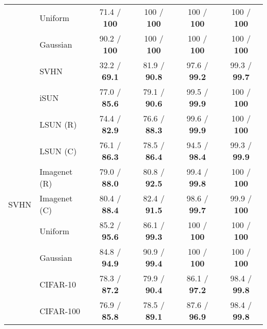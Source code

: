 \documentclass{article}
\begin{document}
\begin{table}[tbh]
\begin{tabular}{clcccc}
     & Uniform &   71.4 / \textbf{100} &    100 / \textbf{100} &    100 / \textbf{100} &    100 / \textbf{100} \\
     & Gaussian &   90.2 / \textbf{100} &    100 / \textbf{100} &    100 / \textbf{100} &    100 / \textbf{100} \\
     & SVHN &  32.2 / \textbf{69.1} &  81.9 / \textbf{90.8} &  97.6 / \textbf{99.2} &  99.3 / \textbf{99.7} \\
\midrule
\multirow{9}{*}{SVHN} & iSUN &  77.0 / \textbf{85.6} &  79.1 / \textbf{90.6} &  99.5 / \textbf{99.9} &    100 / \textbf{100} \\
     & LSUN (R) &  74.4 / \textbf{82.9} &  76.6 / \textbf{88.3} &  99.6 / \textbf{99.9} &    100 / \textbf{100} \\
     & LSUN (C) &  76.1 / \textbf{86.3} &  78.5 / \textbf{86.4} &  94.5 / \textbf{98.4} &  99.3 / \textbf{99.9} \\
     & Imagenet (R) &  79.0 / \textbf{88.0} &  80.8 / \textbf{92.5} &  99.4 / \textbf{99.8} &    100 / \textbf{100} \\
     & Imagenet (C) &  80.4 / \textbf{88.4} &  82.4 / \textbf{91.5} &  98.6 / \textbf{99.7} &   99.9 / \textbf{100} \\
     & Uniform &  85.2 / \textbf{95.6} &  86.1 / \textbf{99.3} &    100 / \textbf{100} &    100 / \textbf{100} \\
     & Gaussian &  84.8 / \textbf{94.9} &  90.9 / \textbf{99.4} &    100 / \textbf{100} &    100 / \textbf{100} \\
     & CIFAR-10 &  78.3 / \textbf{87.2} &  79.9 / \textbf{90.4} &  86.1 / \textbf{97.2} &  98.4 / \textbf{99.8} \\
     & CIFAR-100 &  76.9 / \textbf{85.8} &  78.5 / \textbf{89.1} &  87.6 / \textbf{96.9} &  98.4 / \textbf{99.8} \\
\bottomrule
\end{tabular}
 \end{table}
\end{document}
